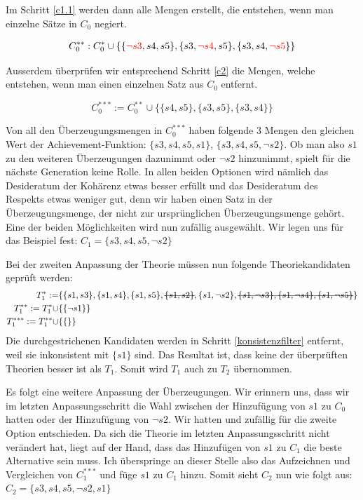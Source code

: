 \documentclass{article}
\newcommand{\stkout}[1]{\ifmmode\text{\sout{\ensuremath{#1}}}\else\sout{#1}\fi} %
\begin{document}
 Im Schritt \ref{c1.1} werden dann alle Mengen erstellt, die entstehen, wenn man einzelne Sätze in $C_0$ negiert.
 
 \begin{equation} \notag
 \begin{split}
 C_0^{**}: C_0^* \cup \{\{\textcolor{red}{\neg s3}, s4, s5\}, \{s3, \textcolor{red}{\neg s4}, s5\}, \{s3, s4, \textcolor{red}{\neg s5}\}\}
 \end{split}
 \end{equation}
 
 Ausserdem überprüfen wir entsprechend Schritt \ref{c2} die Mengen, welche entstehen, wenn man einen einzelnen Satz aus $C_0$ entfernt.
 
$$
    C_0^{***}:= C_0^{**} \cup \{ \{s4,s5\}, \{s3,s5\}, \{s3,s4\} \}
$$
 
 Von all den Überzeugungsmengen in $C_0^{***}$ haben folgende 3 Mengen den gleichen Wert der Achievement-Funktion: $\{s3,s4,s5,s1\}$, $\{s3,s4,s5,\neg s2\}$. Ob man also $s1$ zu den weiteren Überzeugungen dazunimmt oder $\neg s2$ hinzunimmt, spielt für die nächste Generation keine Rolle. In allen beiden Optionen wird nämlich das Desideratum der Kohärenz etwas besser erfüllt und das Desideratum des Respekts etwas weniger gut, denn wir haben einen Satz in der Überzeugungsmenge, der nicht zur ursprünglichen Überzeugungsmenge gehört. 
Eine der beiden Möglichkeiten wird nun zufällig ausgewählt. Wir legen uns für das Beispiel fest: $C_1 = \{s3, s4, s5, \neg s2\}$
 
 Bei der zweiten Anpassung der Theorie müssen nun folgende Theoriekandidaten geprüft werden:
\begin{align}
    T_1^{*}:= &\{\{s1, s3\}, \{s1, s4\}, \{s1, s5\},\stkout{\{s1, s2\}}, \{s1, \neg s2\}, \stkout{\{s1, \neg s3\}, \{s1, \neg s4\}, \{s1, \neg s5\}}\}\\
    T_1^{**}:= T_1^{*} \cup &\{\{\neg s1\}\}\\
    T_1^{***}:= T_1^{**} \cup &\{\{\}\}
\end{align}
Die durchgestrichenen Kandidaten werden in Schritt \ref{konsistenzfilter} entfernt, weil sie inkonsistent mit $\{s1\}$ sind.
 Das Resultat ist, dass keine der überprüften Theorien besser ist als $T_1$. Somit wird $T_1$ auch zu $T_2$ übernommen.
 
 Es folgt eine weitere Anpassung der Überzeugungen. Wir erinnern uns, dass wir im letzten Anpassungsschritt die Wahl zwischen der Hinzufügung von $s1$ zu $C_0$ hatten oder der Hinzufügung von $\neg s2$. Wir hatten und zufällig für die zweite Option entschieden. Da sich die Theorie im letzten Anpassungsschritt nicht verändert hat, liegt auf der Hand, dass das Hinzufügen von $s1$ zu $C_1$ die beste Alternative sein muss. Ich überspringe an dieser Stelle also das Aufzeichnen und Vergleichen von $C_1^{***}$ und füge $s1$ zu $C_1$ hinzu. Somit sieht $C_2$ nun wie folgt aus: $C_2 = \{s3, s4, s5, \neg s2, s1\}$
 
\end{document}
